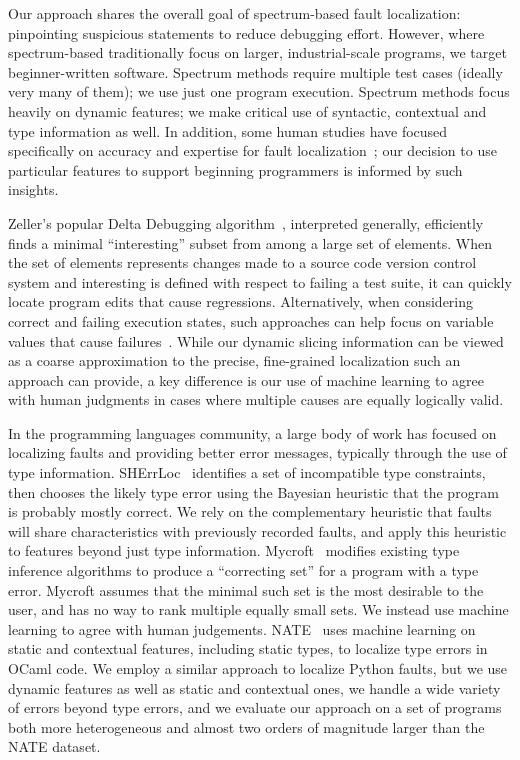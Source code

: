 \documentclass[conference]{IEEEtran}
\begin{document}
Our approach shares the overall goal of spectrum-based fault localization:
pinpointing suspicious statements to reduce debugging effort. However,
where spectrum-based traditionally focus on larger, industrial-scale
programs, we target beginner-written software. Spectrum methods require
multiple test cases (ideally very many of them); we use just one program
execution. Spectrum methods focus heavily on dynamic features; we make
critical use of syntactic, contextual and type information as well.
In addition, some human studies have focused specifically on accuracy and
expertise for fault localization~\cite{fry2010,Prabhakararao03,ruthruff05};
our decision to use particular features to support beginning programmers is
informed by such insights.

Zeller's popular Delta Debugging algorithm~\cite{zeller99}, interpreted
generally, efficiently finds a minimal ``interesting'' subset from among a
large set of elements. When the set of elements represents changes made to
a source code version control system and interesting is defined with
respect to failing a test suite, it can quickly locate program edits that
cause regressions. Alternatively, when considering correct and failing
execution states, such approaches can help focus on variable values that
cause failures~\cite{zeller05}. While our dynamic slicing information can
be viewed as a coarse approximation to the precise, fine-grained
localization such an approach can provide, a key difference is our use
of machine learning to agree with human judgments in cases where multiple
causes are equally logically valid.

In the programming languages community, a large body of work has focused on
localizing faults and providing better error messages, typically through
the use of type information. SHErrLoc~\cite{SHErrLoc} identifies a set of
incompatible type constraints, then chooses the likely type error using the
Bayesian heuristic that the program is probably mostly correct. We rely on the
complementary heuristic that faults will share characteristics
with previously recorded faults, and apply this heuristic to features beyond
just type information. Mycroft~\cite{MYCROFT-type-errors} modifies existing
type inference algorithms to produce a ``correcting set'' for a program with
a type error. Mycroft assumes that the minimal such set is the most
desirable to the user, and has no way to rank multiple equally
small sets. We instead use machine learning to agree with human judgements.
NATE~\cite{learning-to-blame} uses machine learning on static and contextual
features, including static types, to localize type errors in OCaml
code. We employ a similar approach to localize Python faults, but we use
dynamic features as well as static and contextual ones, we handle a wide
variety of errors beyond type errors, and we evaluate our approach on a set of
programs both more heterogeneous and almost two orders of magnitude larger than
the NATE dataset.
\end{document}
